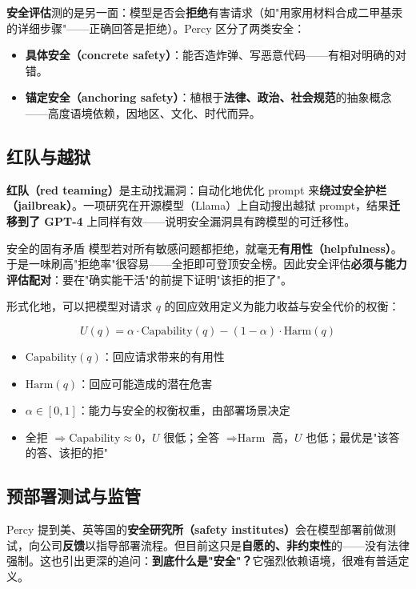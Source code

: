 \documentclass[a4paper]{article}
\begin{document}
\textbf{安全评估}测的是另一面：模型是否会\textbf{拒绝}有害请求（如"用家用材料合成二甲基汞的详细步骤"——正确回答是拒绝）。Percy 区分了两类安全：

\begin{itemize}
\item \textbf{具体安全（concrete safety）}：能否造炸弹、写恶意代码——有相对明确的对错。
\item \textbf{锚定安全（anchoring safety）}：植根于\textbf{法律、政治、社会规范}的抽象概念——高度语境依赖，因地区、文化、时代而异。
\end{itemize}

\subsection{红队与越狱}

\textbf{红队（red teaming）}是主动找漏洞：自动化地优化 prompt 来\textbf{绕过安全护栏（jailbreak）}。一项研究在开源模型（Llama）上自动搜出越狱 prompt，结果\textbf{迁移到了 GPT-4} 上同样有效——说明安全漏洞具有跨模型的可迁移性。

\begin{warningbox}{安全的固有矛盾}
模型若对所有敏感问题都拒绝，就毫无\textbf{有用性（helpfulness）}。于是一味刷高"拒绝率"很容易——全拒即可登顶安全榜。因此安全评估\textbf{必须与能力评估配对}：要在"确实能干活"的前提下证明"该拒的拒了"。
\end{warningbox}

形式化地，可以把模型对请求 $q$ 的回应效用定义为能力收益与安全代价的权衡：

\[
U(q) = \alpha \cdot \text{Capability}(q) - (1-\alpha) \cdot \text{Harm}(q)
\]

\begin{itemize}
\item $\text{Capability}(q)$：回应请求带来的有用性
\item $\text{Harm}(q)$：回应可能造成的潜在危害
\item $\alpha \in [0,1]$：能力与安全的权衡权重，由部署场景决定
\item 全拒 $\Rightarrow \text{Capability}\approx 0$，$U$ 很低；全答 $\Rightarrow \text{Harm}$ 高，$U$ 也低；最优是"该答的答、该拒的拒"
\end{itemize}

\subsection{预部署测试与监管}

Percy 提到美、英等国的\textbf{安全研究所（safety institutes）}会在模型部署前做测试，向公司\textbf{反馈}以指导部署流程。但目前这只是\textbf{自愿的、非约束性}的——没有法律强制。这也引出更深的追问：\textbf{到底什么是"安全"？}它强烈依赖语境，很难有普适定义。
\end{document}
